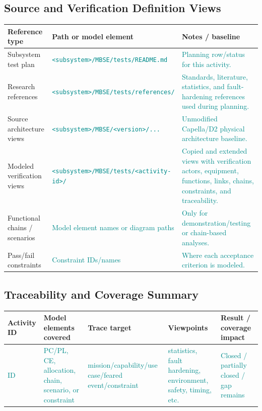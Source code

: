 \documentclass{../common/latex/delta_base_styles/delta_base_styles}
\newcommand{\placeholder}[1]{\textcolor{DarkCyan}{#1}}
\begin{document}
\subsection{Source and Verification Definition Views}
\begin{tabular}{|>{\centering\arraybackslash}m{3.1cm}
                |>{\centering\arraybackslash}m{5.0cm}
                |>{\centering\arraybackslash}m{7.0cm}|}
\hline
\textbf{Reference type} & \textbf{Path or model element} & \textbf{Notes / baseline} \\
\hline
Subsystem test plan & \placeholder{\texttt{<subsystem>/MBSE/tests/README.md}} & \placeholder{Planning row/status for this activity.} \\
\hline
Research references & \placeholder{\texttt{<subsystem>/MBSE/tests/references/}} & \placeholder{Standards, literature, statistics, and fault-hardening references used during planning.} \\
\hline
Source architecture views & \placeholder{\texttt{<subsystem>/MBSE/<version>/...}} & \placeholder{Unmodified Capella/D2 physical architecture baseline.} \\
\hline
Modeled verification views & \placeholder{\texttt{<subsystem>/MBSE/tests/<activity-id>/}} & \placeholder{Copied and extended views with verification actors, equipment, functions, links, chains, constraints, and traceability.} \\
\hline
Functional chains / scenarios & \placeholder{Model element names or diagram paths} & \placeholder{Only for demonstration/testing or chain-based analyses.} \\
\hline
Pass/fail constraints & \placeholder{Constraint IDs/names} & \placeholder{Where each acceptance criterion is modeled.} \\
\hline
\end{tabular}

\subsection{Traceability and Coverage Summary}
\begin{tabular}{|>{\centering\arraybackslash}m{2.3cm}
                |>{\centering\arraybackslash}m{3.0cm}
                |>{\centering\arraybackslash}m{3.1cm}
                |>{\centering\arraybackslash}m{3.2cm}
                |>{\centering\arraybackslash}m{3.2cm}|}
\hline
\textbf{Activity ID} & \textbf{Model elements covered} & \textbf{Trace target} & \textbf{Viewpoints} & \textbf{Result / coverage impact} \\
\hline
\placeholder{ID} & \placeholder{PC/PL, CE, allocation, chain, scenario, or constraint} & \placeholder{mission/capability/use case/feared event/constraint} & \placeholder{statistics, fault hardening, environment, safety, timing, etc.} & \placeholder{Closed / partially closed / gap remains} \\
\hline
\end{tabular}
\end{document}
